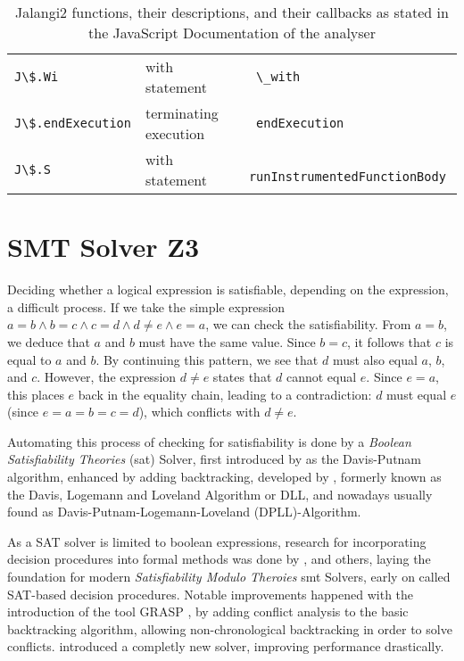 \begin{table}[h]
{\begin{tabular}{l|l|l}
		{\lstinline|J\$.Wi          |} & with statement                                        &\lstinline| \_with                      |            \\
		{\lstinline|J\$.endExecution|} & terminating execution                                 &\lstinline| endExecution                |            \\
		{\lstinline|J\$.S           |} & with statement                                        &\lstinline| runInstrumentedFunctionBody |            \\
	\end{tabular}}
	\caption[List of Jalangi2 functions]{Jalangi2  functions, their descriptions, and their callbacks as stated in the JavaScript Documentation of the analyser}
	\label{tab:jal-fun}
\end{table}

\section{SMT Solver Z3}
\label{sec:z3}

Deciding whether a logical expression is satisfiable, depending on the expression, a difficult process.
If we take the simple expression $a = b \land b= c\land c = d \land d \neq e \land e = a$, we can check the satisfiability.
From $a = b$, we deduce that $a$ and $b$ must have the same value. 
Since $b = c$, it follows that $c$ is equal to $a$ and $b$. 
By continuing this pattern, we see that $d$ must also equal $a$, $b$, and $c$. 
However, the expression $d \neq e$ states that $d$ cannot equal $e$. Since $e = a$, this places $e$ back in the equality chain, leading to a contradiction: $d$ must equal $e$ (since $e = a = b = c = d$), which conflicts with $d \neq e$.

Automating this process of checking for satisfiability is done by a \textit{Boolean Satisfiability Theories} (\gls{sat}) Solver, first introduced by  \citet{davis_computing_1960} as the Davis-Putnam algorithm, enhanced by adding backtracking, developed by \citet{davis_machine_1962}, formerly known as the Davis, Logemann and Loveland Algorithm or DLL, and nowadays usually found as Davis-Putnam-Logemann-Loveland (DPLL)-Algorithm. 

As a SAT solver is limited to boolean expressions, research for incorporating decision procedures into formal methods was done by \citet{shostak_algorithm_1978}, \citet{boyer_integrating_1988} and others, laying the foundation for modern \textit{Satisfiability Modulo Theroies}  \gls{smt} Solvers, early on called SAT-based decision procedures.
Notable improvements happened with the introduction of the tool GRASP \cite{silva_graspnew_nodate}, by adding conflict analysis to the basic backtracking algorithm, allowing non-chronological backtracking in order to solve conflicts. \citet{moskewicz_chaff_nodate} introduced a completly new solver, improving performance drastically.  





